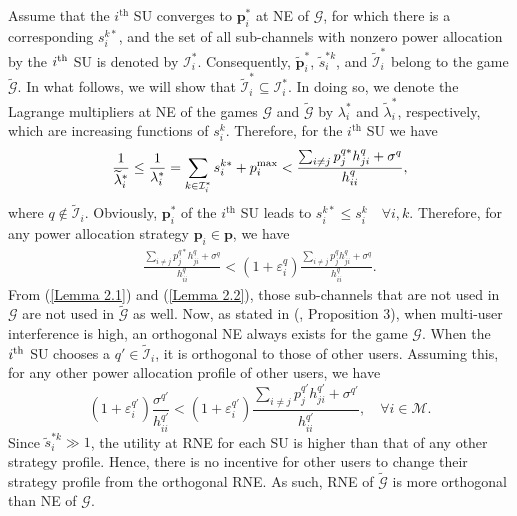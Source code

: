 \documentclass[peerreview,onecolumn,11pt,draftclsnofoot]{IEEEtran}\usepackage{amsmath}\usepackage{amsfonts}\usepackage{epsfig}\usepackage{amssymb}\usepackage{graphicx}\usepackage{amssymb,amsmath}\usepackage{cite}\usepackage{color,soul}\newcommand\T{\rule{0pt}{3.1ex}}
\begin{document}
Assume that the $i^\text{th}$ SU converges to $\mathbf{p}_{i}^{*}$ at NE of
$\mathcal{G}$, for which there is a corresponding $s_{i}^{k*}$, and the set of all sub-channels with nonzero power allocation by the $i^{\scriptsize{\textnormal{th}}}$ SU is denoted by $\mathcal{I}_{i}^{*}$. Consequently,
$\widetilde{\mathbf{p}}_{i}^{*}$,
$\widetilde{s}_{i}^{*k}$, and
$\widetilde{\mathcal{I}}_{i}^{*}$ belong to the game
$\widetilde{\mathcal{G}}$. In what follows, we will show that
$\widetilde{\mathcal{I}}_{i}^{*}\subseteq \mathcal{I}_{i}^{*}$. In doing so, we denote the Lagrange multipliers at NE of the games
$\mathcal{G}$ and $\widetilde{\mathcal{G}}$ by $\lambda_{i}^{*}$ and $\widetilde{\lambda}_{i}^{*}$, respectively, which are
increasing functions of $s_{i}^{k}$. Therefore, for the $i^\text{th}$ SU we have
\begin{eqnarray}  \label{Lemma 2.1}
 \frac{1}{\widetilde{\lambda}_{i}^{*}}\leq \frac{1}{\lambda_{i}^{*}}= \sum_{k \in \mathcal{I}_{i}^{*} }
s_{i}^{k*}+p_{i}^{\scriptsize{\textnormal{max}}} <
\frac{\sum_{i\neq j} p^{q*}_{j}h^{q}_{ji}+\sigma^{q}}{h_{ii}^{q}},
\end{eqnarray}
where $q \notin \widetilde{\mathcal{I}}_{i}$. Obviously, $\mathbf{p}_{i}^{*}$ of the $i^\text{th}$ SU leads to $s^{k*}_{i}\leq s^{k}_{i} \quad \forall i , k$. Therefore, for any power allocation strategy $\mathbf{p}_{i} \in \mathbf{p}$, we have
\begin{eqnarray}\label{Lemma 2.2}
\frac{\sum_{i\neq j} p^{q*}_{j}h^{q}_{ji}+\sigma^{q}}{h_{ii}^{q}}
<(1+\varepsilon^{q}_{i})\frac{\sum_{i\neq
j}p^{q}_{j}h^{q}_{ji}+\sigma^{q}}{h_{ii}^{q}}.
\end{eqnarray}
From (\ref{Lemma 2.1}) and (\ref{Lemma 2.2}), those sub-channels that are not used in $\mathcal{G}$ are not used in
$\widetilde{\mathcal{G}}$ as well. Now, as stated in (\!\!\cite{Nash1}, Proposition 3), when
multi-user interference is high, an orthogonal NE always exists
for the game $\mathcal{G}$. When the $i^{\scriptsize{\textnormal{th}}}$ SU chooses a $q' \in
\widetilde{\mathcal{I}}_{i}$, it is orthogonal to those of other users. Assuming this, for any other power allocation profile of other users, we have
\begin{equation}\label{Lemma 2.3}
(1+\varepsilon^{q'}_{i})\frac{\sigma^{q'}}{h_{ii}^{q'}}<
(1+\varepsilon^{q'}_{i})\frac{\sum_{i\neq j}
p^{q'}_{j}h^{q'}_{ji}+\sigma^{q'}}{h_{ii}^{q'}}, \quad \forall i \in \mathcal{M}.
\end{equation}
Since $\widetilde{s}_{i}^{*k}\gg 1$, the utility at RNE for each SU is higher than that of any other strategy profile. Hence, there is no incentive for other users to change their strategy profile from the orthogonal RNE. As such, RNE of $\widetilde{\mathcal{G}}$ is more orthogonal than NE of $\mathcal{G}$.
\end{document}
